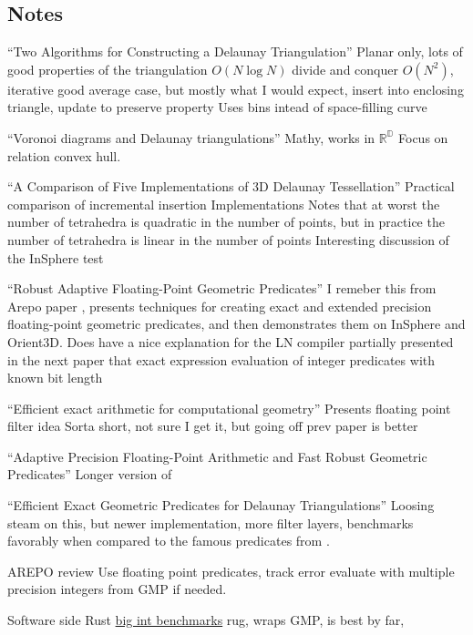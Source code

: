 \subsection{Notes}
\begin{outline}
\1 ``Two Algorithms for Constructing a
Delaunay Triangulation'' \cite{lee1980two}
\2 Planar only, lots of good properties of the triangulation
\2 $O(N \log N)$ divide and conquer
\2 $O(N^2)$, iterative good average case, but mostly what I would expect, insert into enclosing triangle, update to preserve property
\2 Uses bins intead of space-filling curve

\1 ``Voronoi diagrams and Delaunay triangulations'' \cite{fortune2017voronoi}
\2 Mathy, works in $\mathbb{R^D}$
\2 Focus on relation convex hull.

\1 ``A Comparison of Five Implementations of 3D Delaunay Tessellation'' \cite{liu2005comparison}
\2 Practical comparison of incremental insertion Implementations
\2 Notes that at worst the number of tetrahedra is quadratic in the number of points, but in practice the number of tetrahedra is linear in the number of points
\2 Interesting discussion of the InSphere test

\1 ``Robust Adaptive Floating-Point Geometric Predicates'' \cite{shewchuk1996robust}
\2 I remeber this from Arepo paper \cite{Springel2010Pur}, presents techniques for creating exact and extended precision floating-point geometric predicates, and then demonstrates them on InSphere and Orient3D. 
\2 Does have a nice explanation for the LN compiler partially presented in the next paper that exact expression evaluation of integer predicates with known bit length 

\1 ``Efficient exact arithmetic for computational geometry'' \cite{fortune1993efficient}
\2 Presents floating point filter idea
\2 Sorta short, not sure I get it, but going off prev paper is better

\1 ``Adaptive Precision Floating-Point Arithmetic and Fast Robust Geometric Predicates'' \cite{richard1997adaptive}
\2 Longer version of \cite{shewchuk1996robust}

\1 ``Eﬀicient Exact Geometric Predicates for Delaunay Triangulations'' \cite{devillers2003efficient}
\2 Loosing steam on this, but newer implementation, more filter layers, benchmarks favorably when compared to the famous predicates from \cite{shewchuk1996robust}.

\1 \textsc{AREPO} review \cite{Springel2010Pur}
\2 Use floating point predicates, track error
\2 evaluate with multiple precision integers from \textsc{GMP} if needed.

\1 Software side
\2 Rust \href{https://github.com/tczajka/bigint-benchmark-rs}{big int benchmarks}
\2 rug, wraps GMP, is best by far,

\end{outline}

